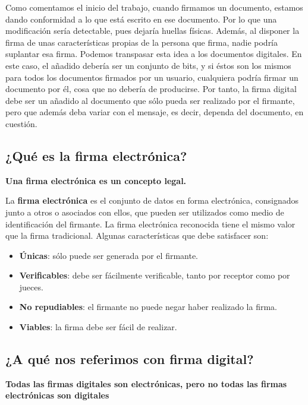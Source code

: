 \documentclass{manual}
\begin{document}
Como comentamos el inicio del trabajo, cuando firmamos un documento, estamos dando conformidad a lo que está escrito en ese documento. Por lo que una modificación sería detectable, pues dejaría huellas físicas. Además, al disponer la firma de unas características propias de la persona que firma, nadie podría suplantar esa firma. Podemos transpasar esta idea a los documentos digitales. En este caso, el añadido debería ser un conjunto de bits, y si éstos son los mismos para todos los documentos firmados por un usuario, cualquiera podría firmar un documento por él, cosa que no debería de producirse. Por tanto, la firma digital debe ser un añadido al documento que sólo pueda ser realizado por el firmante, pero que además deba variar con el mensaje, es decir, dependa del documento, en cuestión.

\subsection{¿Qué es la firma electrónica?}

\begin{center}\textbf{Una firma electrónica es un concepto legal.}\end{center}

La \textbf{firma electrónica} es el conjunto de datos en forma electrónica, consignados junto a otros o asociados con ellos, que pueden ser utilizados como medio de identificación del firmante. La firma electrónica reconocida tiene el mismo valor que la firma tradicional. Algunas características que debe satisfacer son:

\begin{itemize}
	\item \textbf{Únicas}: sólo puede ser generada por el firmante. 
	\item \textbf{Verificables}: debe ser fácilmente verificable, tanto por receptor como por jueces.
	\item \textbf{No repudiables}: el firmante no puede negar haber realizado la firma. 
	\item \textbf{Viables}: la firma debe ser fácil de realizar.
\end{itemize}	


\subsection{¿A qué nos referimos con firma digital?}

\begin{center}\textbf{Todas las firmas digitales son electrónicas, pero no todas las firmas electrónicas son digitales}\end{center}
\end{document}
